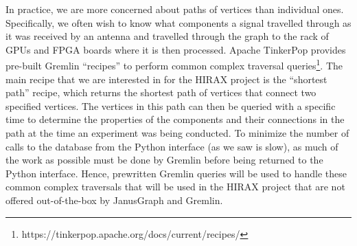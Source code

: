 \documentclass[12pt]{article}
\begin{document}
In practice, we are more concerned about paths of vertices than individual ones. Specifically, we often wish to know what components a signal travelled through as it was received by an antenna and travelled through the graph to the rack of GPUs and FPGA boards where it is then processed. Apache TinkerPop provides pre-built Gremlin ``recipes'' to perform common complex traversal queries\footnote{https://tinkerpop.apache.org/docs/current/recipes/}. The main recipe that we are interested in for the HIRAX project is the ``shortest path'' recipe, which returns the shortest path of vertices that connect two specified vertices. The vertices in this path can then be queried with a specific time to determine the properties of the components and their connections in the path at the time an experiment was being conducted. To minimize the number of calls to the database from the Python interface (as we saw is slow), as much of the work as possible must be done by Gremlin before being returned to the Python interface. Hence, prewritten Gremlin queries will be used to handle these common complex traversals that will be used in the HIRAX project that are not offered out-of-the-box by JanusGraph and Gremlin.
\end{document}
